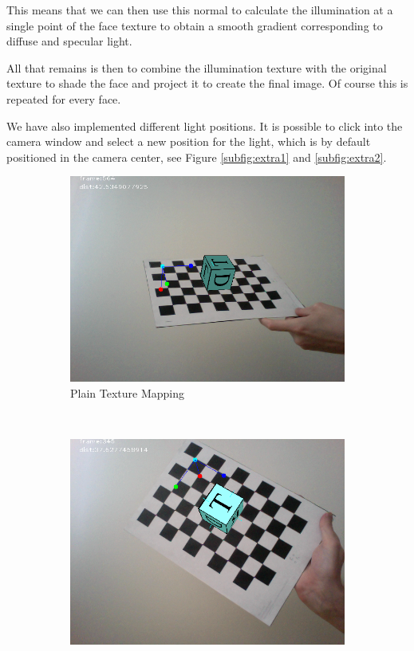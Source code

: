 This means that we can then use this normal to calculate the illumination at a single point of the face texture to obtain a smooth gradient corresponding to diffuse and specular light. 

All that remains is then to combine the illumination texture with the original texture to shade the face and project it to create the final image. Of course this is repeated for every face.

We have also implemented different light positions. It is possible to click into the camera window and select a new position for the light, which is by default positioned in the camera center, see Figure \ref{subfig:extra1} and \ref{subfig:extra2}. 

 \begin{figure}[h!]
	\begin{subfigure}[b]{0.5\textwidth}
		\includegraphics[width=\textwidth]{final/images/texture2.png}
		\caption{Plain Texture Mapping}
		\label{subfig:plaintexture}
	\end{subfigure}
	~
	\begin{subfigure}[b]{0.5\textwidth}
		\includegraphics[width=\textwidth]{final/images/flat.png}

\end{subfigure}
\end{figure}
